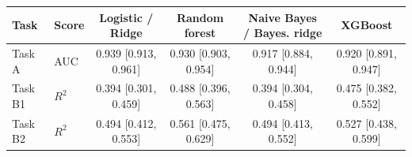 \begin{tabular}{llcccc}
\toprule
Task & Score & Logistic / Ridge & Random forest & Naive Bayes / Bayes. ridge & XGBoost \\
\midrule
Task A & AUC & 0.939 [0.913, 0.961] & 0.930 [0.903, 0.954] & 0.917 [0.884, 0.944] & 0.920 [0.891, 0.947] \\
Task B1 & $R^2$ & 0.394 [0.301, 0.459] & 0.488 [0.396, 0.563] & 0.394 [0.304, 0.458] & 0.475 [0.382, 0.552] \\
Task B2 & $R^2$ & 0.494 [0.412, 0.553] & 0.561 [0.475, 0.629] & 0.494 [0.413, 0.552] & 0.527 [0.438, 0.599] \\
\bottomrule
\end{tabular}